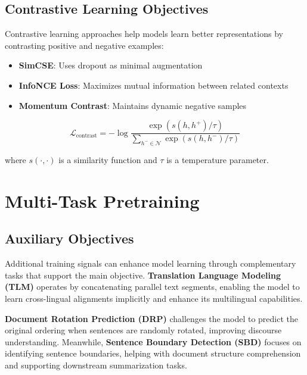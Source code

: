 \subsection{Contrastive Learning Objectives}
\noindent
Contrastive learning approaches help models learn better representations by contrasting positive and negative examples:

\begin{itemize}
    \item \textbf{SimCSE}: Uses dropout as minimal augmentation
    \item \textbf{InfoNCE Loss}: Maximizes mutual information between related contexts
    \item \textbf{Momentum Contrast}: Maintains dynamic negative samples
\end{itemize}

\begin{equation}
\mathcal{L}_\text{contrast} = -\log \frac{\exp(s(h, h^+)/\tau)}{\sum_{h^- \in \mathcal{N}} \exp(s(h, h^-)/\tau)}
\end{equation}

where $s(\cdot,\cdot)$ is a similarity function and $\tau$ is a temperature parameter.

\section{Multi-Task Pretraining}
\label{sec:multi_task}

\subsection{Auxiliary Objectives}
\noindent
Additional training signals can enhance model learning through complementary tasks that support the main objective. \textbf{Translation Language Modeling (TLM)} operates by concatenating parallel text segments, enabling the model to learn cross-lingual alignments implicitly and enhance its multilingual capabilities. 

\textbf{Document Rotation Prediction (DRP)} challenges the model to predict the original ordering when sentences are randomly rotated, improving discourse understanding. Meanwhile, \textbf{Sentence Boundary Detection (SBD)} focuses on identifying sentence boundaries, helping with document structure comprehension and supporting downstream summarization tasks.

